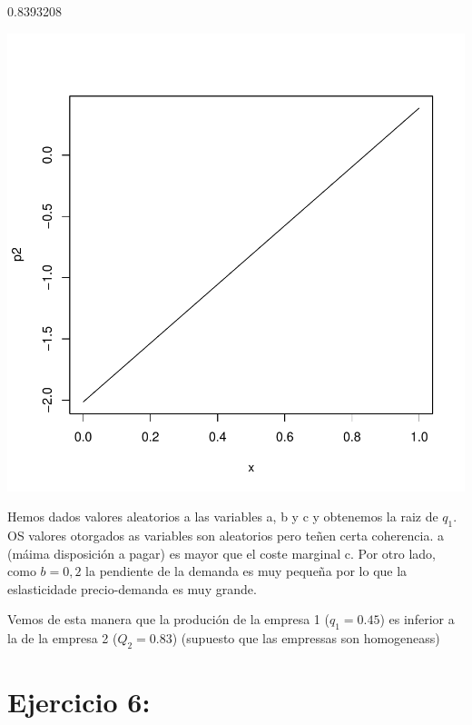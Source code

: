 \documentclass{article}
\begin{document}
\begin{Schunk}
\begin{Soutput}
[1] 0.8393208
\end{Soutput}
\end{Schunk}
\includegraphics{PUTAPRUEBA-004}



Hemos dados valores aleatorios a las variables a, b y c y obtenemos la raiz de $q_1$. OS valores otorgados as variables son aleatorios pero teñen certa coherencia. a (m\'aima disposici\'on a pagar) es mayor que el coste marginal c. Por otro lado, como $b=0,2$ la pendiente de la demanda es muy pequeña por lo que la eslasticidade precio-demanda es muy grande.

Vemos de esta manera que la produci\'on de la empresa 1 ($q_1=0.45$) es inferior a la de la empresa 2 ($Q_2=0.83$) (supuesto que las empressas son homogeneass)





\section{Ejercicio 6:}
\end{document}
